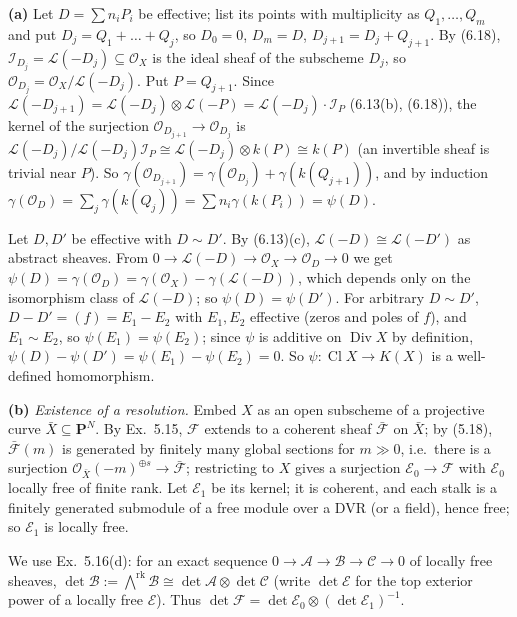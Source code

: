 \documentclass[11pt]{article}
\begin{document}
\textbf{(a)} Let $D=\sum n_iP_i$ be effective; list its points with multiplicity as $Q_1,\dots,Q_m$ and put $D_j=Q_1+\dots+Q_j$, so $D_0=0$, $D_m=D$, $D_{j+1}=D_j+Q_{j+1}$. By (6.18), $\mathcal I_{D_j}=\mathcal L(-D_j)\subseteq\mathcal O_X$ is the ideal sheaf of the subscheme $D_j$, so $\mathcal O_{D_j}=\mathcal O_X/\mathcal L(-D_j)$. Put $P=Q_{j+1}$. Since $\mathcal L(-D_{j+1})=\mathcal L(-D_j)\otimes\mathcal L(-P)=\mathcal L(-D_j)\cdot\mathcal I_P$ (6.13(b), (6.18)), the kernel of the surjection $\mathcal O_{D_{j+1}}\to\mathcal O_{D_j}$ is $\mathcal L(-D_j)/\mathcal L(-D_j)\mathcal I_P\cong\mathcal L(-D_j)\otimes k(P)\cong k(P)$ (an invertible sheaf is trivial near $P$). So $\gamma(\mathcal O_{D_{j+1}})=\gamma(\mathcal O_{D_j})+\gamma(k(Q_{j+1}))$, and by induction $\gamma(\mathcal O_D)=\sum_j\gamma(k(Q_j))=\sum n_i\gamma(k(P_i))=\psi(D)$.

Let $D,D'$ be effective with $D\sim D'$. By (6.13)(c), $\mathcal L(-D)\cong\mathcal L(-D')$ as abstract sheaves. From $0\to\mathcal L(-D)\to\mathcal O_X\to\mathcal O_D\to0$ we get $\psi(D)=\gamma(\mathcal O_D)=\gamma(\mathcal O_X)-\gamma(\mathcal L(-D))$, which depends only on the isomorphism class of $\mathcal L(-D)$; so $\psi(D)=\psi(D')$. For arbitrary $D\sim D'$, $D-D'=(f)=E_1-E_2$ with $E_1,E_2$ effective (zeros and poles of $f$), and $E_1\sim E_2$, so $\psi(E_1)=\psi(E_2)$; since $\psi$ is additive on $\operatorname{Div}X$ by definition, $\psi(D)-\psi(D')=\psi(E_1)-\psi(E_2)=0$. So $\psi:\operatorname{Cl}X\to K(X)$ is a well-defined homomorphism.

\textbf{(b)} \emph{Existence of a resolution.} Embed $X$ as an open subscheme of a projective curve $\bar X\subseteq\mathbf P^N$. By Ex.~5.15, $\mathcal F$ extends to a coherent sheaf $\bar{\mathcal F}$ on $\bar X$; by (5.18), $\bar{\mathcal F}(m)$ is generated by finitely many global sections for $m\gg0$, i.e.\ there is a surjection $\mathcal O_{\bar X}(-m)^{\oplus s}\to\bar{\mathcal F}$; restricting to $X$ gives a surjection $\mathcal E_0\to\mathcal F$ with $\mathcal E_0$ locally free of finite rank. Let $\mathcal E_1$ be its kernel; it is coherent, and each stalk is a finitely generated submodule of a free module over a DVR (or a field), hence free; so $\mathcal E_1$ is locally free.

We use Ex.~5.16(d): for an exact sequence $0\to\mathcal A\to\mathcal B\to\mathcal C\to0$ of locally free sheaves, $\det\mathcal B:=\bigwedge^{\operatorname{rk}}\mathcal B\cong\det\mathcal A\otimes\det\mathcal C$ (write $\det\mathcal E$ for the top exterior power of a locally free $\mathcal E$). Thus $\det\mathcal F=\det\mathcal E_0\otimes(\det\mathcal E_1)^{-1}$.
\end{document}
